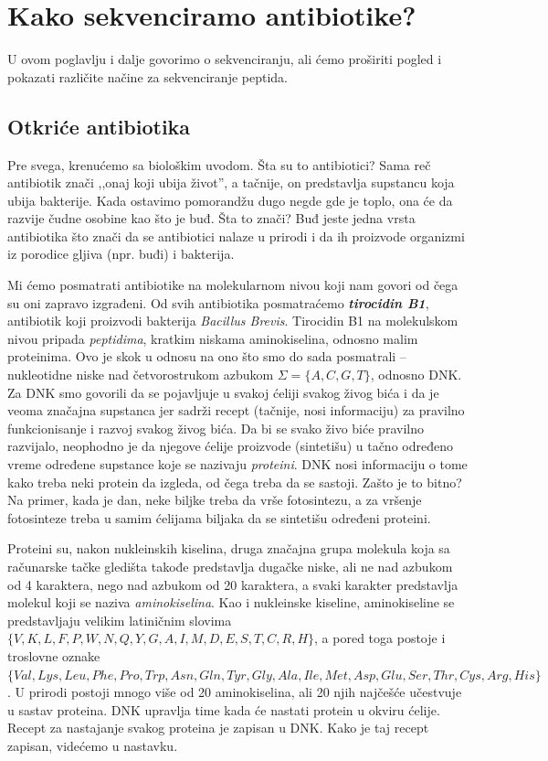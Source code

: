 \chapter{Kako sekvenciramo antibiotike?}
\setbookcodestyle


U ovom poglavlju i dalje govorimo o sekvenciranju, ali ćemo proširiti pogled i pokazati različite načine za sekvenciranje peptida. 

\section{Otkriće antibiotika} \label{otkrice}

Pre svega, krenućemo sa biološkim uvodom. Šta su to antibiotici? Sama reč antibiotik znači ,,onaj koji ubija život'', a tačnije, on predstavlja supstancu koja ubija bakterije. Kada ostavimo pomorandžu dugo negde gde je toplo, ona će da razvije čudne osobine kao što je buđ. Šta to znači? Buđ jeste jedna vrsta antibiotika što znači da se antibiotici nalaze u prirodi i da ih proizvode organizmi iz porodice gljiva (npr. buđi) i bakterija. 

Mi ćemo posmatrati antibiotike na molekularnom nivou koji nam govori od čega su oni zapravo izgrađeni. Od svih antibiotika posmatraćemo \textbf{\textit{tirocidin B1}}, antibiotik koji proizvodi bakterija \textit{Bacillus Brevis}. Tirocidin B1 na molekulskom nivou pripada \textit{peptidima}, kratkim niskama aminokiselina, odnosno malim proteinima. Ovo je skok u odnosu na ono što smo do sada posmatrali -- nukleotidne niske nad četvorostrukom azbukom $\Sigma = \{A, C, G, T\}$, odnosno DNK. Za DNK smo govorili da se pojavljuje u svakoj ćeliji svakog živog bića i da je veoma značajna supstanca jer sadrži recept (tačnije, nosi informaciju) za pravilno funkcionisanje i razvoj svakog živog bića. Da bi se svako živo biće pravilno razvijalo, neophodno je da njegove ćelije proizvode (sintetišu) u tačno određeno vreme određene supstance koje se nazivaju \textit{proteini}. DNK nosi informaciju o tome kako treba neki protein da izgleda, od čega treba da se sastoji. Zašto je to bitno? Na primer, kada je dan, neke biljke treba da vrše fotosintezu, a za vršenje fotosinteze treba u samim ćelijama biljaka da se sintetišu određeni proteini.

Proteini su, nakon nukleinskih kiselina, druga značajna grupa molekula koja sa računarske tačke gledišta takođe predstavlja dugačke niske, ali ne nad azbukom od 4 karaktera, nego nad azbukom od 20 karaktera, a svaki karakter predstavlja molekul koji se naziva \textit{aminokiselina}. Kao i nukleinske kiseline, aminokiseline se predstavljaju velikim latiničnim slovima $ \{V, K, L, F, P, W, N, Q, Y, G, A, I, M, D, E, S, T, C, R, H\}$, a pored toga postoje i troslovne oznake $\{Val, Lys, Leu, Phe, Pro, Trp, Asn, Gln, Tyr, Gly, Ala, Ile, Met, Asp, Glu, Ser, Thr, Cys, Arg, His\}$. U prirodi postoji mnogo više od 20 aminokiselina, ali 20 njih najčešće učestvuje u sastav proteina. DNK upravlja time kada će nastati protein u okviru ćelije. Recept za nastajanje svakog proteina je zapisan u DNK. Kako je taj recept zapisan, videćemo u nastavku.

